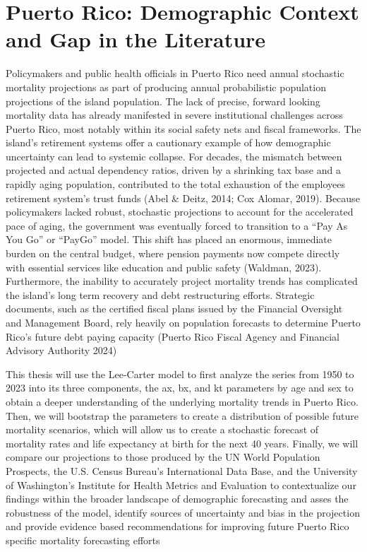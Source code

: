 \documentclass[
  12pt,
]{report}
\begin{document}
\section{Puerto Rico: Demographic Context and Gap in the
Literature}\label{puerto-rico-demographic-context-and-gap-in-the-literature}

Policymakers and public health officials in Puerto Rico need annual
stochastic mortality projections as part of producing annual
probabilistic population projections of the island population. The lack
of precise, forward looking mortality data has already manifested in
severe institutional challenges across Puerto Rico, most notably within
its social safety nets and fiscal frameworks. The island's retirement
systems offer a cautionary example of how demographic uncertainty can
lead to systemic collapse. For decades, the mismatch between projected
and actual dependency ratios, driven by a shrinking tax base and a
rapidly aging population, contributed to the total exhaustion of the
employees retirement system's trust funds (Abel \& Deitz, 2014; Cox
Alomar, 2019). Because policymakers lacked robust, stochastic
projections to account for the accelerated pace of aging, the government
was eventually forced to transition to a ``Pay As You Go'' or ``PayGo''
model. This shift has placed an enormous, immediate burden on the
central budget, where pension payments now compete directly with
essential services like education and public safety (Waldman, 2023).
Furthermore, the inability to accurately project mortality trends has
complicated the island's long term recovery and debt restructuring
efforts. Strategic documents, such as the certified fiscal plans issued
by the Financial Oversight and Management Board, rely heavily on
population forecasts to determine Puerto Rico's future debt paying
capacity (Puerto Rico Fiscal Agency and Financial Advisory Authority
2024)

This thesis will use the Lee-Carter model to first analyze the series
from 1950 to 2023 into its three components, the ax, bx, and kt
parameters by age and sex to obtain a deeper understanding of the
underlying mortality trends in Puerto Rico. Then, we will bootstrap the
parameters to create a distribution of possible future mortality
scenarios, which will allow us to create a stochastic forecast of
mortality rates and life expectancy at birth for the next 40 years.
Finally, we will compare our projections to those produced by the UN
World Population Prospects, the U.S. Census Bureau's International Data
Base, and the University of Washington's Institute for Health Metrics
and Evaluation to contextualize our findings within the broader
landscape of demographic forecasting and asses the robustness of the
model, identify sources of uncertainty and bias in the projection and
provide evidence based recommendations for improving future Puerto Rico
specific mortality forecasting efforts
\end{document}
